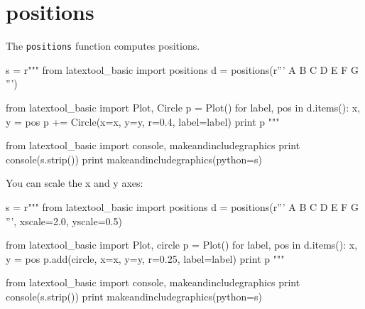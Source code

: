 \section{positions}

The \verb!positions! function computes positions.
\begin{python}
s = r"""
from latextool_basic import positions
d = positions(r'''
  A
B C D
    E F
G
''')

from latextool_basic import Plot, Circle
p = Plot()
for label, pos in d.items():
    x, y = pos
    p += Circle(x=x, y=y, r=0.4, label=label)
print p
"""

from latextool_basic import console, makeandincludegraphics
print console(s.strip())
print makeandincludegraphics(python=s)
\end{python}


You can scale the x and y axes:
\begin{python}
s = r"""
from latextool_basic import positions
d = positions(r'''
  A
B C D
    E F
G
''', xscale=2.0, yscale=0.5)

from latextool_basic import Plot, circle
p = Plot()
for label, pos in d.items():
    x, y = pos
    p.add(circle, x=x, y=y, r=0.25, label=label)
print p
"""

from latextool_basic import console, makeandincludegraphics
print console(s.strip())
print makeandincludegraphics(python=s)
\end{python}

